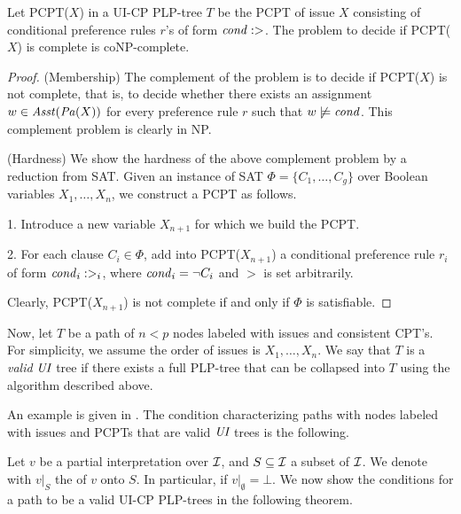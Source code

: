 \begin{thm}
\label{thm:completeness}
	Let PCPT($X$) in a UI-CP PLP-tree $T$ be the PCPT of issue $X$ consisting of conditional preference
	rules $r$'s of form $\mathit{cond}: >$.
	The problem to decide if PCPT($X$) is complete is coNP-complete.
\end{thm}
\begin{proof}
	(Membership) The complement of the problem is to decide if PCPT($X$) is not complete, that is,
	to decide whether there exists an assignment $w \in \mathit{Asst}(\mathit{Pa}(X))$ for every preference rule $r$
	such that $w \not \models \mathit{cond}$.  This complement problem is clearly in NP.

	(Hardness) We show the hardness of the above complement problem by a reduction from SAT.
	Given an instance of SAT $\Phi=\{C_1,\ldots,C_g\}$ over Boolean variables
	$X_1,\ldots,X_n$, we construct a PCPT as follows.

	1. Introduce a new variable $X_{n+1}$ for which we build the PCPT.

	2. For each clause $C_i \in \Phi$, add into PCPT($X_{n+1}$) a conditional preference
	rule $r_i$ of form $\mathit{cond}_i: >_i$, where $\mathit{cond}_i=\neg C_i$ and $>$ is set arbitrarily.

	Clearly, PCPT($X_{n+1}$) is not complete if and only if $\Phi$ is satisfiable.
\end{proof}

Now, let $T$ be a path of $n<p$ nodes labeled with issues and consistent CPT's.
For simplicity, we assume the order of issues is $X_1,\ldots,X_n$.
We say that $T$ is a \emph{valid} $\textit{UI}$ tree if
there exists a full PLP-tree that can be collapsed into $T$ using
the algorithm described above.

An example is given in .
The condition characterizing paths with nodes labeled with
issues and PCPTs that are valid $\textit{UI}$ trees is the following.

Let $v$ be a partial interpretation over $\mathcal{I}$, and $S \subseteq \mathcal{I}$ a subset of $\mathcal{I}$.
We denote with $v|_S$ the  of $v$ onto $S$.
In particular, if $v|_\emptyset=\bot$.
We now show the conditions for a path to be a valid UI-CP PLP-trees in the following theorem.

